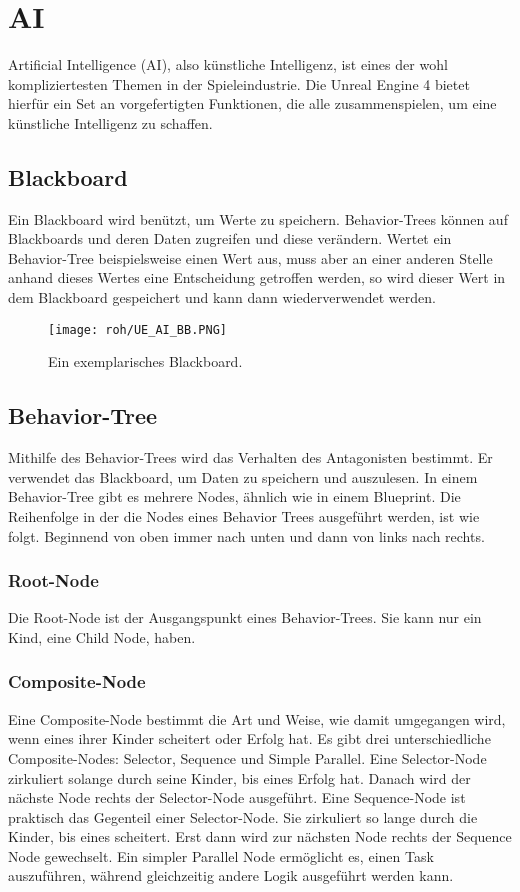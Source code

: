 \section{AI}
Artificial Intelligence (AI), also künstliche Intelligenz, ist eines der wohl kompliziertesten Themen in der Spieleindustrie.
Die Unreal Engine 4 bietet hierfür ein Set an vorgefertigten Funktionen, die alle zusammenspielen, um eine künstliche Intelligenz zu schaffen.
\subsection{Blackboard}
Ein Blackboard wird benützt, um Werte zu speichern.\citep{ue:AIBB}
Behavior-Trees können auf Blackboards und deren Daten zugreifen und diese verändern.
Wertet ein Behavior-Tree beispielsweise einen Wert aus, muss aber an einer anderen Stelle anhand dieses Wertes eine Entscheidung getroffen werden, so wird dieser Wert in dem Blackboard gespeichert und kann dann wiederverwendet werden.
\begin{figure}[H]
    \centering
    \texttt{[image: roh/UE\_AI\_BB.PNG]}
    \caption{Ein exemplarisches Blackboard.}
    \label{UE:AI_BB}
\end{figure}
\subsection{Behavior-Tree}
Mithilfe des Behavior-Trees wird das Verhalten des Antagonisten bestimmt.\citep{ue:AIBB}
Er verwendet das Blackboard, um Daten zu speichern und auszulesen.
In einem Behavior-Tree gibt es mehrere Nodes, ähnlich wie in einem Blueprint.
Die Reihenfolge in der die Nodes eines Behavior Trees ausgeführt werden, ist wie folgt.
Beginnend von oben immer nach unten und dann von links nach rechts.\citep{ue:AIBTNodes}
\subsubsection{Root-Node}
Die Root-Node ist der Ausgangspunkt eines Behavior-Trees.
Sie kann nur ein Kind, eine Child Node, haben.
\subsubsection{Composite-Node}
Eine Composite-Node bestimmt die Art und Weise, wie damit umgegangen wird, wenn eines ihrer Kinder scheitert oder Erfolg hat.
Es gibt drei unterschiedliche Composite-Nodes:
Selector, Sequence und Simple Parallel.
Eine Selector-Node zirkuliert solange durch seine Kinder, bis eines Erfolg hat.
Danach wird der nächste Node rechts der Selector-Node ausgeführt.
Eine Sequence-Node ist praktisch das Gegenteil einer Selector-Node.
Sie zirkuliert so lange durch die Kinder, bis eines scheitert.
Erst dann wird zur nächsten Node rechts der Sequence Node gewechselt.
Ein simpler Parallel Node ermöglicht es, einen Task auszuführen, während gleichzeitig andere Logik ausgeführt werden kann.
